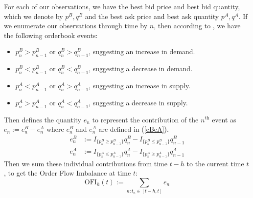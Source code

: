 For each of our observations, we have the best bid price and best bid quantity,
which we denote by $p^B, q^B$ and the best ask price and best ask quantity  $p^A, q^A$.
If we enumerate our observations through time by $n$, then according to \cite{CONT2013}, we have
the following orderbook events:
 \begin{itemize}
     \item $p_n^B > p_{n-1}^B$ or  $q_n^B > q_{n-1}^B$, suggesting an increase in demand.
     \item $p_n^B < p_{n-1}^B$ or  $q_n^B < q_{n-1}^B$, suggesting a decrease in demand.
     \item $p_n^A < p_{n-1}^A$ or  $q_n^A > q_{n-1}^A$, suggesting an increase in supply.
     \item $p_n^A > p_{n-1}^A$ or  $q_n^A < q_{n-1}^A$, suggesting a decrease in supply.
\end{itemize}
Then \cite{CONT2013} defines the quantity $e_n$ to represent the contribution of the  $n^{\text{th}}$ event
as $e_n := e_n^B - e_n^A$ where  $e_n^B$ and $e_n^A$ are defined in (\ref{eBeA}).
\begin{equation}
    \begin{aligned}
        e_{n}^B &:= I_{\{ p_{n}^B \geq p_{n-1}^B \}} q_{n}^B  - I_{\{ p_{n}^B \leq p_{n-1}^B \}} q_{n-1}^B \\
        e_{n}^A &:= I_{\{ p_{n}^A \leq p_{n-1}^A \}} q_{n}^A - I_{\{ p_{n}^A \geq p_{n-1}^A \}} q_{n-1}^A
    \end{aligned}
    \label{eBeA}
\end{equation}
Then we sum these individual contributions from time $t-h$ to the current time $t$,
to get the Order Flow Imbalance at time $t$:
\begin{equation}
    \text{OFI}_h(t) := \sum_{n : t_n \in [t-h, t]} e_n
    \label{OFI}
\end{equation}

